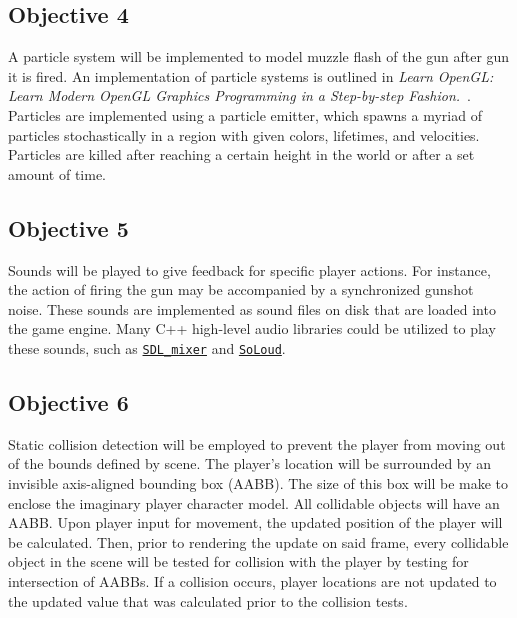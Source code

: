 \documentclass {article}
\begin{document}

\subsection{Objective 4}
A particle system will be implemented to model muzzle flash of the gun after gun it is fired. An implementation of particle systems is outlined in \textit{Learn OpenGL: Learn Modern OpenGL Graphics Programming in a Step-by-step Fashion.}~\cite{learnopengl}. Particles are implemented using a particle emitter, which spawns a myriad of particles stochastically in a region with given colors, lifetimes, and velocities. Particles are killed after reaching a certain height in the world or after a set amount of time.


\subsection{Objective 5}
Sounds will be played to give feedback for specific player actions. For instance, the action of firing the gun may be accompanied by a synchronized gunshot noise. These sounds are implemented as sound files on disk that are loaded into the game engine. Many C++ high-level audio libraries could be utilized to play these sounds, such as \href{https://github.com/libsdl-org/SDL\_mixer}{\texttt{SDL\_mixer}} and \href{https://solhsa.com/soloud/}{\texttt{SoLoud}}.

\subsection{Objective 6}
Static collision detection will be employed to prevent the player from moving out of the bounds defined by scene. The player's location will be surrounded by an invisible axis-aligned bounding box (AABB). The size of this box will be make to enclose the imaginary player character model. All collidable objects will have an AABB. Upon player input for movement, the updated position of the player will be calculated. Then, prior to rendering the update on said frame, every collidable object in the scene will be tested for collision with the player by testing for intersection of AABBs. If a collision occurs, player locations are not updated to the updated value that was calculated prior to the collision tests.
\end{document}
